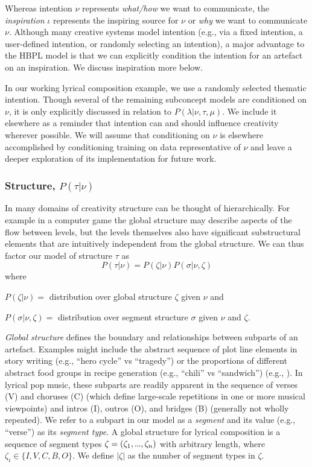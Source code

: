 \documentclass[letterpaper]{article}
\newcommand\mydots{\hbox to .75em{.\hss.\hss.}}
\begin{document}
Whereas intention $\nu$ represents \emph{what/how} we want to communicate, the \emph{inspiration} $\iota$ represents the inspiring source for $\nu$ or \emph{why} we want to communicate $\nu$. Although many creative systems model intention (e.g., via a fixed intention, a user-defined intention, or randomly selecting an intention), a major advantage to the HBPL model is that we can explicitly condition the intention for an artefact on an inspiration. We discuss inspiration more below. 

In our working lyrical composition example, we use a randomly selected thematic intention. Though several of the remaining subconcept models are conditioned on $\nu$, it is only explicitly discussed in relation to $P(\lambda|\nu,\tau,\mu)$. We include it elsewhere as a reminder that intention can and should influence creativity wherever possible. We will assume that conditioning on $\nu$ is elsewhere accomplished by conditioning training on data representative of $\nu$ and leave a deeper exploration of its implementation for future work.

\subsubsection{Structure, $P(\tau|\nu)$}

In many domains of creativity structure can be thought of hierarchically. For example in a computer game the global structure may describe aspects of the flow between levels, but the levels themselves also have significant substructural elements that are intuitively independent from the global structure. We can thus factor our model of structure $\tau$ as
\[ P(\tau|\nu) = P(\zeta|\nu)P(\sigma|\nu,\zeta) \]
\noindent where 

\(P(\zeta|\nu)=\) distribution over global structure $\zeta$ given $\nu$ and

\(P(\sigma|\nu,\zeta)=\) distribution over segment structure $\sigma$ given $\nu$ and $\zeta$.

\emph{Global structure} defines the boundary and relationships between subparts of an artefact. Examples might include the abstract sequence of plot line elements in story writing (e.g., ``hero cycle'' vs ``tragedy'') or the proportions of different abstract food groups in recipe generation (e.g., ``chili'' vs ``sandwich'') (e.g., \cite{morris2012soup}). In lyrical pop music, these subparts are readily apparent in the sequence of verses (V) and choruses (C) (which define large-scale repetitions in one or more musical viewpoints) and intros (I), outros (O), and bridges (B) (generally not wholly repeated). We refer to a subpart in our model as a \textit{segment} and its value (e.g., ``verse'') as its \textit{segment type}. A global structure for lyrical composition is a sequence of segment types $\zeta = (\zeta_1,\mydots,\zeta_n)$ with arbitrary length, where $\zeta_i\in\{I,V,C,B,O\}$. We define $|\zeta|$ as the number of segment types in $\zeta$.
\end{document}
